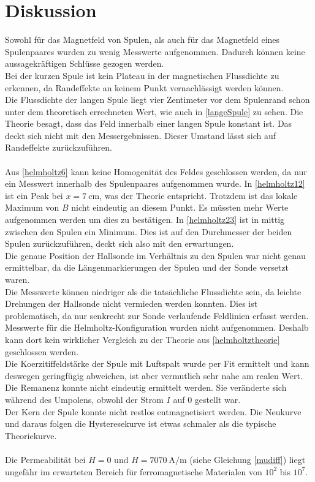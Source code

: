 \section{Diskussion}
\label{sec:Diskussion}

Sowohl für das Magnetfeld von Spulen, als auch für das Magnetfeld eines Spulenpaares wurden zu wenig Messwerte aufgenommen.
Dadurch können keine aussagekräftigen Schlüsse gezogen werden.\\
Bei der kurzen Spule ist kein Plateau in der magnetischen Flussdichte zu erkennen, da Randeffekte an keinem
Punkt vernachlässigt werden können. \\
Die Flussdichte der langen Spule liegt vier Zentimeter vor dem Spulenrand schon unter dem theoretisch errechneten Wert, wie auch in
\autoref{langeSpule} zu sehen. Die Theorie besagt, dass das Feld innerhalb einer langen Spule
konstant ist. Das deckt sich nicht mit den Messergebnissen. Dieser Umstand lässt sich auf Randeffekte zurückzuführen.\\
\\
Aus \autoref{helmholtz6} kann keine Homogenität des Feldes geschlossen werden, da nur ein Messwert innerhalb des
Spulenpaares aufgenommen wurde. In \autoref{helmholtz12} ist ein Peak bei $x = \SI{7}{\centi\meter}$, was der Theorie entspricht.
Trotzdem ist das lokale Maximum von $B$ nicht eindeutig an diesem Punkt. Es müssten mehr Werte aufgenommen werden um dies zu bestätigen.
In \autoref{helmholtz23} ist in mittig zwischen den Spulen ein Minimum. Dies ist auf den Durchmesser der beiden Spulen 
zurückzuführen, deckt sich also mit den erwartungen.\\
Die genaue Position der Hallsonde im Verhältnis zu den Spulen war nicht genau ermittelbar, da die Längenmarkierungen der Spulen und der Sonde
versetzt waren.\\
Die Messwerte können niedriger als die tatsächliche Flussdichte sein, da leichte Drehungen der Hallsonde nicht vermieden werden konnten.
Dies ist problematisch, da nur senkrecht zur Sonde verlaufende Feldlinien erfasst werden.
Messwerte für die Helmholtz-Konfiguration wurden nicht aufgenommen. Deshalb kann dort kein wirklicher Vergleich zu der Theorie aus \autoref{helmholtztheorie} geschlossen werden.
\\
Die Koerzitiffeldstärke der Spule mit Luftspalt wurde per Fit ermittelt und kann deswegen geringfügig abweichen, ist aber 
vermutlich sehr nahe am realen Wert.\\
Die Remanenz konnte nicht eindeutig ermittelt werden. Sie veränderte sich während des Umpolens, obwohl der Strom $I$ auf 0 gestellt war.\\
Der Kern der Spule konnte nicht restlos entmagnetisiert werden. Die Neukurve und daraus folgen die Hysteresekurve ist etwas schmaler als die typische Theoriekurve.\\
\\
Die Permeabilität bei $H = 0$ und $H = \SI{7070}{\ampere\per\meter}$ (siehe Gleichung \eqref{mudiff}) liegt ungefähr im erwarteten Bereich für ferromagnetische Materialen
von $10^2$ bis $10^7$. 


\newpage